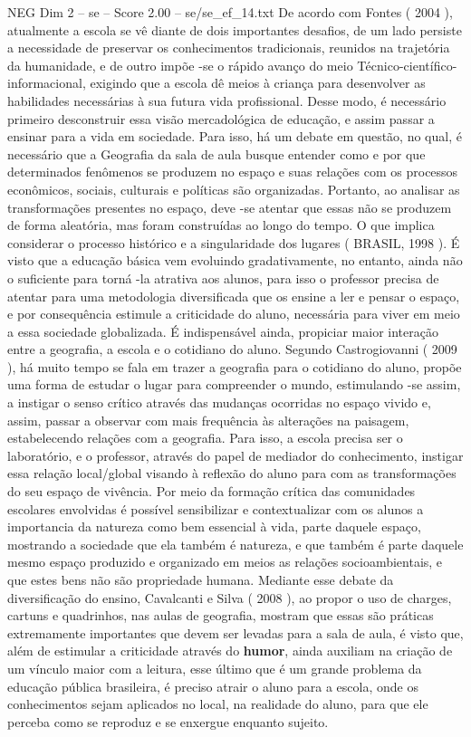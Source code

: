 \begin{textsample}{NEG Dim 2 – se – Score 2.00 – se/se\_ef\_14.txt}
De acordo com Fontes ( 2004 ), atualmente a escola se vê diante de dois importantes desafios, de um lado persiste a necessidade de preservar os conhecimentos tradicionais, reunidos na trajetória da humanidade, e de outro impõe -se o rápido avanço do meio Técnico-científico-informacional, exigindo que a escola dê meios à criança para desenvolver as habilidades necessárias à sua futura vida profissional.
Desse modo, é necessário primeiro desconstruir essa visão mercadológica de educação, e assim passar a ensinar para a vida em sociedade.
Para isso, há um debate em questão, no qual, é necessário que a Geografia da sala de aula busque entender como e por que determinados fenômenos se produzem no espaço e suas relações com os processos econômicos, sociais, culturais e políticas são organizadas.
Portanto, ao analisar as transformações presentes no espaço, deve -se atentar que essas não se produzem de forma aleatória, mas foram construídas ao longo do tempo.
O que implica considerar o processo histórico e a singularidade dos lugares ( BRASIL, 1998 ).
É visto que a educação básica vem evoluindo gradativamente, no entanto, ainda não o suficiente para torná -la atrativa aos alunos, para isso o professor precisa de atentar para uma metodologia diversificada que os ensine a ler e pensar o espaço, e por consequência estimule a criticidade do aluno, necessária para viver em meio a essa sociedade globalizada.
É indispensável ainda, propiciar maior interação entre a geografia, a escola e o cotidiano do aluno.
Segundo Castrogiovanni ( 2009 ), há muito tempo se fala em trazer a geografia para o cotidiano do aluno, propõe uma forma de estudar o lugar para compreender o mundo, estimulando -se assim, a instigar o senso crítico através das mudanças ocorridas no espaço vivido e, assim, passar a observar com mais frequência às alterações na paisagem, estabelecendo relações com a geografia.
Para isso, a escola precisa ser o laboratório, e o professor, através do papel de mediador do conhecimento, instigar essa relação local/global visando à reflexão do aluno para com as transformações do seu espaço de vivência.
Por meio da formação crítica das comunidades escolares envolvidas é possível sensibilizar e contextualizar com os alunos a importancia da natureza como bem essencial à vida, parte daquele espaço, mostrando a sociedade que ela também é natureza, e que também é parte daquele mesmo espaço produzido e organizado em meios as relações socioambientais, e que estes bens não são propriedade humana.
Mediante esse debate da diversificação do ensino, Cavalcanti e Silva ( 2008 ), ao propor o uso de charges, cartuns e quadrinhos, nas aulas de geografia, mostram que essas são práticas extremamente importantes que devem ser levadas para a sala de aula, é visto que, além de estimular a criticidade através do \textbf{humor}, ainda auxiliam na criação de um vínculo maior com a leitura, esse último que é um grande problema da educação pública brasileira, é preciso atrair o aluno para a escola, onde os conhecimentos sejam aplicados no local, na realidade do aluno, para que ele perceba como se reproduz e se enxergue enquanto sujeito.

\end{textsample}
